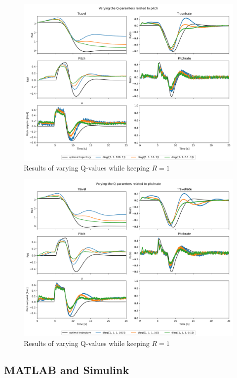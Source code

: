 \documentclass[../main.tex]{subfiles}
\begin{document}
\begin{figure}[h]
	\centering
	\includegraphics[width=0.8\linewidth]{figures/LAB3_Q_variations_pitch.png}
	\caption{Results of varying Q-values while keeping $R=1$}
	\label{fig:LAB3_Q_variations_pitch}
\end{figure}

\begin{figure}[h]
	\centering
	\includegraphics[width=0.8\linewidth]{figures/LAB3_Q_variations_pitchrate.png}
	\caption{Results of varying Q-values while keeping $R=1$}
	\label{fig:LAB3_Q_variations_pitchrate}
\end{figure}


\clearpage

\subsection{MATLAB and Simulink}

\end{document}

